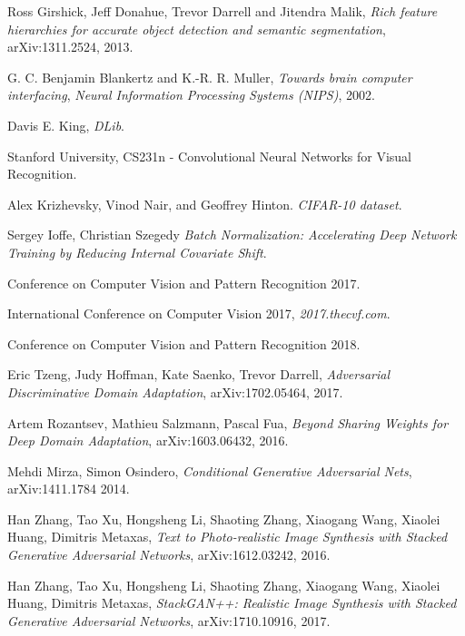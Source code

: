 \begin{thebibliography}{}
	Ross Girshick, Jeff Donahue, Trevor Darrell and Jitendra Malik,
    \emph{Rich feature hierarchies for accurate object detection and semantic segmentation},
	arXiv:1311.2524, 2013.

	G. C. Benjamin Blankertz and K.-R. R. Muller,
    \emph{Towards brain computer interfacing},
	\emph{Neural Information Processing Systems (NIPS)},
	2002.


	Davis E. King,
    \emph{DLib}.


	Stanford University,
	CS231n - Convolutional Neural Networks for Visual Recognition.

    Alex Krizhevsky, Vinod Nair, and Geoffrey Hinton.
	\emph{CIFAR-10 dataset}.

    Sergey Ioffe, Christian Szegedy
    \emph{Batch Normalization: Accelerating Deep Network Training by Reducing Internal Covariate Shift}.


	Conference on Computer Vision and Pattern Recognition 2017.

	International Conference on Computer Vision 2017,
    \emph{2017.thecvf.com}.

	Conference on Computer Vision and Pattern Recognition 2018.

    Eric Tzeng, Judy Hoffman, Kate Saenko, Trevor Darrell,
    \emph{Adversarial Discriminative Domain Adaptation},
    arXiv:1702.05464, 2017.

    Artem Rozantsev, Mathieu Salzmann, Pascal Fua,
    \emph{Beyond Sharing Weights for Deep Domain Adaptation},
    arXiv:1603.06432, 2016.

    Mehdi Mirza, Simon Osindero,
    \emph{Conditional Generative Adversarial Nets},
    arXiv:1411.1784 2014.

    Han Zhang, Tao Xu, Hongsheng Li, Shaoting Zhang, Xiaogang Wang, Xiaolei Huang, Dimitris Metaxas,
    \emph{Text to Photo-realistic Image Synthesis with Stacked Generative Adversarial Networks},
    arXiv:1612.03242, 2016.

    Han Zhang, Tao Xu, Hongsheng Li, Shaoting Zhang, Xiaogang Wang, Xiaolei Huang, Dimitris Metaxas,
    \emph{StackGAN++: Realistic Image Synthesis with Stacked Generative Adversarial Networks},
    arXiv:1710.10916, 2017.
    

\end{thebibliography}
